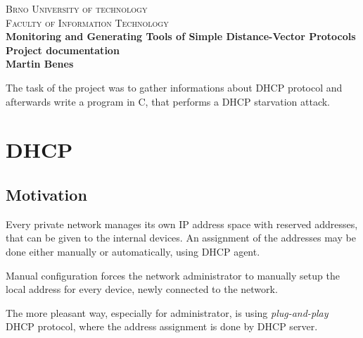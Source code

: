 \documentclass[10pt,a4paper,titlepage]{article}
\begin{document}
    \begin{titlepage}
    
    \begin{center}
    \textsc{\LARGE Brno University of technology}\\[0.5cm]
    \textsc{\large Faculty of Information Technology}\\[8cm]
    
    { \huge \bfseries Monitoring and Generating Tools of Simple Distance-Vector Protocols}\\[0.3cm]
    { \Large \bfseries Project documentation}\\[0.5cm]
    { \bfseries Martin Benes}\\
    
    \end{center}
    
    \end{titlepage}
    \newpage
    
    
    
    The task of the project was to gather informations about DHCP protocol and
    afterwards write a program in C, that performs a DHCP starvation attack.
    
    
    
    \section*{DHCP}
    
    
    \subsection*{Motivation}
    Every private network manages its own IP address space with reserved addresses, that
    can be given to the internal devices. An assignment of the addresses may be
    done either manually or automatically, using DHCP agent.
    
    Manual configuration forces the network administrator to manually setup the
    local address for every device, newly connected to the network.
    
    The more pleasant way, especially for administrator, is using {\it plug-and-play}
    DHCP protocol, where the address assignment is done by DHCP server.
    \cite{computernetworking} \cite{pocitacovesite}
    
\end{document}
